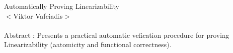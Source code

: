 \documentclass{article}
\begin{document}
\noindent
Automatically Proving Linearizability\\
$<$Viktor Vafeiadis$>$ \\\\
Abstract : Presents a practical automatic vefication procedure for proving Linearizability (aatomicity and functional correctness).\\
\end{document}
